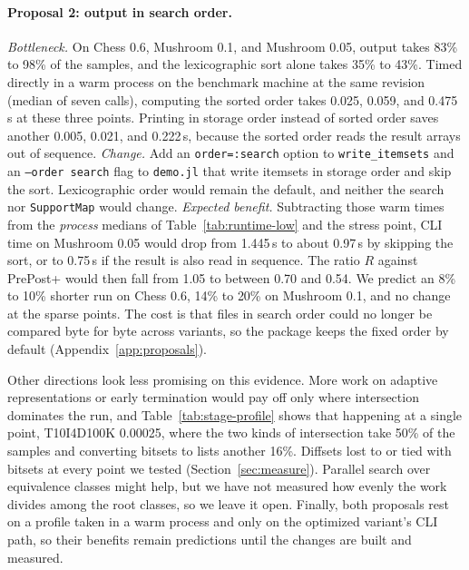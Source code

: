 \paragraph{Proposal 2: output in search order.}
\emph{Bottleneck.} On Chess 0.6, Mushroom 0.1, and Mushroom 0.05, output takes 83\% to
98\% of the samples, and the lexicographic sort alone takes 35\% to 43\%. Timed directly
in a warm process on the benchmark machine at the same revision (median of seven calls),
computing the sorted order takes 0.025, 0.059, and 0.475\,s at these three points.
Printing in storage order instead of sorted order saves another 0.005, 0.021, and
0.222\,s, because the sorted order reads the result arrays out of sequence.
\emph{Change.} Add an \texttt{order=:search} option to \texttt{write\_itemsets} and an
\texttt{--order search} flag to \texttt{demo.jl} that write itemsets in storage order and
skip the sort. Lexicographic order would remain the default, and neither the search nor
\texttt{SupportMap} would change. \emph{Expected benefit.} Subtracting those warm times
from the \emph{process} medians of Table~\ref{tab:runtime-low} and the stress point, CLI
time on Mushroom 0.05 would drop from 1.445\,s to about 0.97\,s by skipping the sort, or
to 0.75\,s if the result is also read in sequence. The ratio $R$ against PrePost+ would
then fall from 1.05 to between 0.70 and 0.54. We predict an 8\% to 10\% shorter run on
Chess 0.6, 14\% to 20\% on Mushroom 0.1, and no change at the sparse points. The cost is
that files in search order could no longer be compared byte for byte across variants, so
the package keeps the fixed order by default (Appendix~\ref{app:proposals}).

Other directions look less promising on this evidence. More work on adaptive
representations or early termination would pay off only where intersection dominates the
run, and Table~\ref{tab:stage-profile} shows that happening at a single point,
T10I4D100K 0.00025, where the two kinds of intersection take 50\% of the samples and
converting bitsets to lists another 16\%. Diffsets lost to or tied with bitsets at every
point we tested (Section~\ref{sec:measure}). Parallel search over equivalence classes
might help, but we have not measured how evenly the work divides among the root classes,
so we leave it open. Finally, both proposals rest on a profile taken in a warm process
and only on the optimized variant's CLI path, so their benefits remain predictions until
the changes are built and measured.

